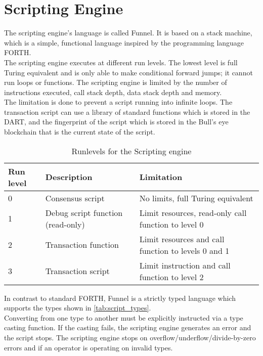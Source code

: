 \section{Scripting Engine}
The scripting engine's language is called Funnel. It is based on a stack machine, which is a simple, functional language inspired by the programming language FORTH. \\
The scripting engine executes at different run levels. The lowest level is full Turing equivalent and is only able to make conditional forward jumps; it cannot run loops or functions. The scripting engine is limited by the number of instructions executed, call stack depth, data stack depth and memory. \\
The limitation is done to prevent a script running into infinite loops. The transaction script can use a library of standard functions which is stored in the DART, and the fingerprint of the script which is stored in the Bull’s eye blockchain that is the current state of the script.


\begin{table}[H]
 \begin{center}
\begin{tabular}{|p{1cm}|p{3.5cm}|l|}
\hline
Run level & Description & Limitation \\
\hline
0 & Consensus script & No limits, full Turing equivalent \\
\hline
1 & Debug script function (read-only) & Limit resources, read-only call function to level 0 \\
\hline
2 & Transaction function & Limit resources and call function to levels 0 and 1 \\
\hline
3 & Transaction script & Limit instruction and call function to level 2 \\
\hline
\end{tabular}
\end{center}
\caption{Runlevels for the Scripting engine}
\label{tab:script_runlevl}
\end{table}

In contrast to standard FORTH, Funnel is a strictly typed language which supports the types shown in \cref{tab:script_types}.\\
Converting from one type to another must be explicitly instructed via a type casting function. If the casting fails, the scripting engine generates an error and the script stops. The scripting engine stops on overflow/underflow/divide-by-zero errors and if an operator is operating on invalid types.

